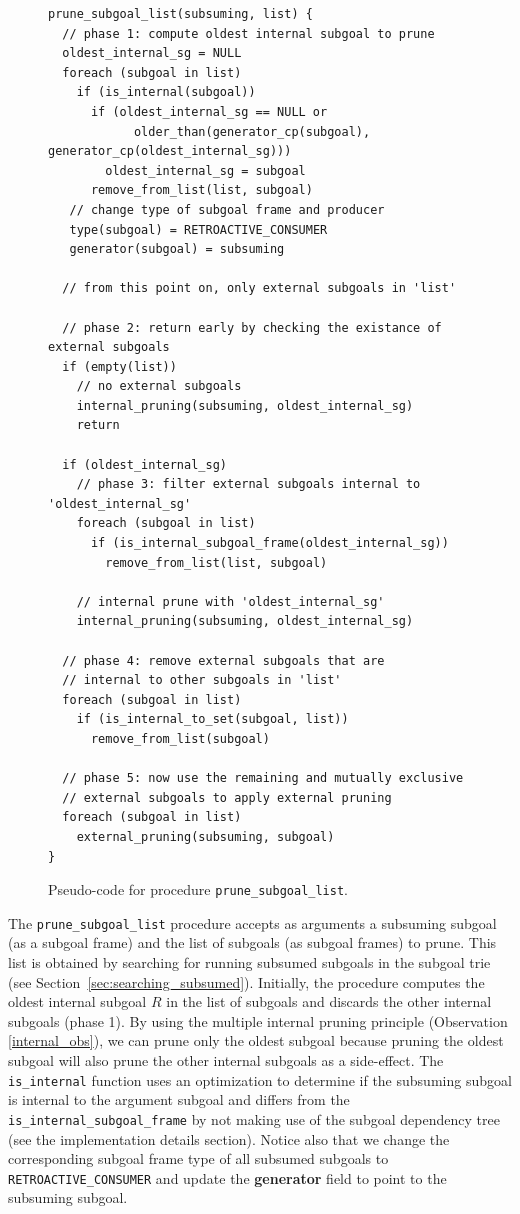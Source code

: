 \begin{figure}[ht]
\begin{Verbatim}
prune_subgoal_list(subsuming, list) {
  // phase 1: compute oldest internal subgoal to prune
  oldest_internal_sg = NULL
  foreach (subgoal in list)
    if (is_internal(subgoal))
      if (oldest_internal_sg == NULL or
            older_than(generator_cp(subgoal), generator_cp(oldest_internal_sg)))
        oldest_internal_sg = subgoal   
      remove_from_list(list, subgoal)
   // change type of subgoal frame and producer
   type(subgoal) = RETROACTIVE_CONSUMER
   generator(subgoal) = subsuming
      
  // from this point on, only external subgoals in 'list'
  
  // phase 2: return early by checking the existance of external subgoals
  if (empty(list))
    // no external subgoals
    internal_pruning(subsuming, oldest_internal_sg)
    return
  
  if (oldest_internal_sg)
    // phase 3: filter external subgoals internal to 'oldest_internal_sg'
    foreach (subgoal in list)
      if (is_internal_subgoal_frame(oldest_internal_sg))
        remove_from_list(list, subgoal)
    
    // internal prune with 'oldest_internal_sg'
    internal_pruning(subsuming, oldest_internal_sg)
  
  // phase 4: remove external subgoals that are
  // internal to other subgoals in 'list'
  foreach (subgoal in list)
    if (is_internal_to_set(subgoal, list))
      remove_from_list(subgoal)
    
  // phase 5: now use the remaining and mutually exclusive
  // external subgoals to apply external pruning
  foreach (subgoal in list)
    external_pruning(subsuming, subgoal)
}
\end{Verbatim}
\caption{Pseudo-code for procedure \texttt{prune\_subgoal\_list}.}
\label{fig:prune_subgoal_list}
\end{figure}

The \texttt{prune\_subgoal\_list} procedure accepts as arguments a subsuming subgoal (as a subgoal frame) and the list of
subgoals (as subgoal frames) to prune. This list is obtained by searching for running subsumed subgoals in the subgoal trie
(see Section~\ref{sec:searching_subsumed}). Initially, the procedure computes the oldest internal subgoal $R$ in the
list of subgoals and discards the other internal subgoals (phase 1). By using the multiple internal pruning principle
(Observation \ref{internal_obs}), we can prune only the oldest subgoal because pruning the oldest subgoal
will also prune the other internal subgoals as a side-effect. The \texttt{is\_internal} function uses an optimization
to determine if the subsuming subgoal is internal to the argument subgoal and differs from the
\texttt{is\_internal\_subgoal\_frame} by not making use of the subgoal dependency tree (see the implementation details
section). Notice also that we change the corresponding subgoal frame
type of all subsumed subgoals to \texttt{RETROACTIVE\_CONSUMER} and update the \textbf{generator} field to
point to the subsuming subgoal.

